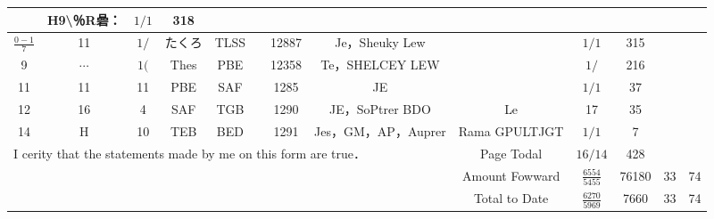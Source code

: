 \documentclass[10pt]{article}
\begin{document}
\begin{center}
\begin{tabular}{|c|c|c|c|c|c|c|c|c|c|c|c|c|}
 & H9\textbackslash ％R碞： & \(1 / 1\) & 318 &  &  \\
\hline
\(\frac{0-1}{7}\) & 11 & \(1 /\) & たくろ & TLSS &  & 12887 & Je，Sheuky Lew &  & \(1 / 1\) & 315 &  &  \\
\hline
9 & \(\cdots\) & \(1(\) & Thes & PBE &  & 12358 & Te，SHELCEY LEW &  & \(1 /\) & 216 &  &  \\
\hline
11 & 11 & 11 & PBE & SAF &  & 1285 & JE &  & \(1 / 1\) & 37 &  &  \\
\hline
12 & 16 & 4 & SAF & TGB &  & 1290 & JE，SoPtrer BDO & Le & 17 & 35 &  &  \\
\hline
14 & H & 10 & TEB & BED &  & 1291 & Jes，GM，AP，Auprer & Rama GPULTJGT & \(1 / 1\) & 7 &  &  \\
\hline
\multicolumn{8}{|l|}{\multirow[t]{3}{*}{I cerity that the statements made by me on this form are true．}} & Page Todal & \(16 / 14\) & 428 &  &  \\
\hline
 &  &  &  &  &  &  &  & Amount Fowward & \( \frac{6554}{5455} \) & 76180 & 33 & 74 \\
\hline
 &  &  &  &  &  &  &  & Total to Date & \( \frac{6270}{5969} \) & 7660 & 33 & 74 \\
\hline
\end{tabular}
\end{center}
\end{document}
